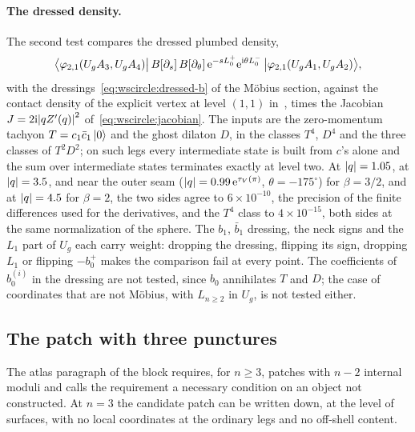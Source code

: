 \paragraph{The dressed density.}
The second test compares the dressed plumbed density,
\begin{equation}
  \big\langle \varphi_{2,1}(U_g A_3, U_g A_4) \big| \, B[\partial_s] \, B[\partial_\theta] \, \mathrm{e}^{- s L_0^+} \mathrm{e}^{\mathrm{i} \theta L_0^-} \, \big| \varphi_{2,1}(U_g A_1, U_g A_2) \big\rangle,
\end{equation}
with the dressings~\eqref{eq:wscircle:dressed-b} of the Möbius section, against the contact density of the explicit vertex at level $(1, 1)$ in~\cite{Erbin:2026:SL2CVerticesClosed}, times the Jacobian $J = 2 \mathrm{i} {|q Z'(q)|}^2$ of~\eqref{eq:wscircle:jacobian}.
The inputs are the zero-momentum tachyon $T = c_1 \bar c_1 \ket{0}$ and the ghost dilaton $D$, in the classes $T^4$, $D^4$ and the three classes of $T^2 D^2$; on such legs every intermediate state is built from $c$'s alone and the sum over intermediate states terminates exactly at level two.
At ${|q|} = 1.05$, at ${|q|} = 3.5$, and near the outer seam (${|q|} = 0.99 \, \mathrm{e}^{\tau_V(\pi)}$, $\theta = - 175^\circ$) for $\beta = 3 / 2$, and at ${|q|} = 4.5$ for $\beta = 2$, the two sides agree to $6 \times 10^{-10}$, the precision of the finite differences used for the derivatives, and the $T^4$ class to $4 \times 10^{-15}$, both sides at the same normalization of the sphere.
The $b_1$, $\bar b_1$ dressing, the neck signs and the $L_1$ part of $U_g$ each carry weight: dropping the dressing, flipping its sign, dropping $L_1$ or flipping $- b_0^+$ makes the comparison fail at every point.
The coefficients of $b_0^{(i)}$ in the dressing are not tested, since $b_0$ annihilates $T$ and $D$; the case of coordinates that are not Möbius, with $L_{n \geq 2}$ in $U_g$, is not tested either.

\subsection{The patch with three punctures}
\label{sec:wscircle:npatch}


The atlas paragraph of the block requires, for $n \geq 3$, patches with $n - 2$ internal moduli and calls the requirement a necessary condition on an object not constructed.
At $n = 3$ the candidate patch can be written down, at the level of surfaces, with no local coordinates at the ordinary legs and no off-shell content.

